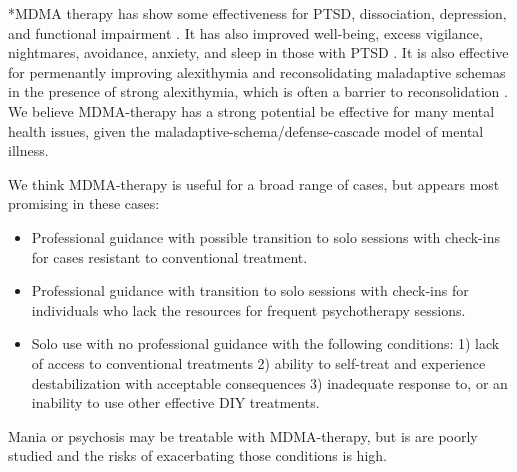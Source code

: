 \documentclass[12pt,letterpaper]{article}
\begin{document}
*MDMA therapy has show some effectiveness for PTSD, dissociation, depression, and functional impairment \cite{greenMeta}. It has also improved well-being, excess vigilance, nightmares, avoidance, anxiety, and sleep in those with PTSD \cite{smithSystematic}. It is also effective for permenantly improving alexithymia and reconsolidating maladaptive schemas in the presence of strong alexithymia, which is often a barrier to reconsolidation \cite{vanSelfExperience}. We believe MDMA-therapy has a strong potential be effective for many mental health issues, given the maladaptive-schema/defense-cascade model of mental illness. 

We think MDMA-therapy is useful for a broad range of cases, but appears most promising in these cases:
\begin{itemize}
    \item Professional guidance with possible transition to solo sessions with check-ins for cases resistant to conventional treatment.
    \item Professional guidance with transition to solo sessions with check-ins for individuals who lack the resources for frequent psychotherapy sessions.
    \item Solo use with no professional guidance with the following conditions: 1) lack of access to conventional treatments 2) ability to self-treat and experience destabilization with acceptable consequences 3) inadequate response to, or an inability to use other effective DIY treatments. 
\end{itemize}
Mania or psychosis may be treatable with MDMA-therapy, but is are poorly studied and the risks of exacerbating those conditions is high. 
\end{document}
